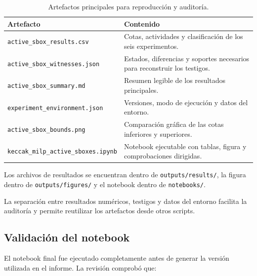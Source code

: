 \begin{table}[htbp]
    \centering
    \caption{Artefactos principales para reproducción y auditoría.}
    \label{tab:artefactos_experimentales}
    \begin{tabular}{p{}p{}}
        \hline
        \textbf{Artefacto} & \textbf{Contenido} \\
        \hline

        \texttt{active\_sbox\_results.csv}
        &
        Cotas, actividades y clasificación de los seis experimentos.
        \\[3pt]

        \texttt{active\_sbox\_witnesses.json}
        &
        Estados, diferencias y soportes necesarios para reconstruir los
        testigos.
        \\[3pt]

        \texttt{active\_sbox\_summary.md}
        &
        Resumen legible de los resultados principales.
        \\[3pt]

        \texttt{experiment\_environment.json}
        &
        Versiones, modo de ejecución y datos del entorno.
        \\[3pt]

        \texttt{active\_sbox\_bounds.png}
        &
        Comparación gráfica de las cotas inferiores y superiores.
        \\[3pt]

        \texttt{keccak\_milp\_active\_sboxes.ipynb}
        &
        Notebook ejecutable con tablas, figura y comprobaciones dirigidas.
        \\
        \hline
    \end{tabular}
\end{table}

Los archivos de resultados se encuentran dentro de
\texttt{outputs/results/}, la figura dentro de
\texttt{outputs/figures/} y el notebook dentro de
\texttt{notebooks/}.

La separación entre resultados numéricos, testigos y datos del entorno
facilita la auditoría y permite reutilizar los artefactos desde otros
scripts.


\subsection{Validación del notebook}
\label{subsec:validacion_notebook}

El notebook final fue ejecutado completamente antes de generar la versión
utilizada en el informe. La revisión comprobó que:

